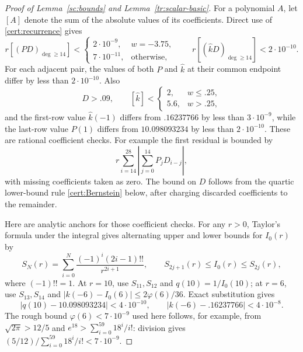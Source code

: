\begin{proof}[Proof of Lemma~\ref{sc:bounds} and Lemma~\ref{tr:scalar-basic}]
For a polynomial $A$, let $[A]$ denote the sum of the absolute values of
its coefficients. Direct use of \eqref{cert:recurrence} gives
\begin{equation}\label{cert:residuals}
 r[(PD)_{\deg\ge14}]<
 \begin{cases}2\cdot10^{-9},&w=-3.75,\\7\cdot10^{-11},&\text{otherwise},\end{cases}
 \qquad r[(\widehat k D)_{\deg\ge14}]<2\cdot10^{-10}.
\end{equation}
For each adjacent pair, the values of both $P$ and $\widehat k$ at their common
endpoint differ by less than $2\cdot10^{-10}$. Also
\begin{equation}\label{cert:additional-poly}
 D>.09,\qquad [\widehat k]<\begin{cases}2,&w\le.25,\\5.6,&w>.25,
 \end{cases}
\end{equation}
and the first-row value $\widehat k(-1)$ differs from $.16237766$ by less than
$3\cdot10^{-9}$, while the last-row value $P(1)$ differs from
$10.098093234$ by less than $2\cdot10^{-10}$.
These are rational coefficient checks. For example the first residual is
bounded by
\[
 r\sum_{i=14}^{28}\left|\sum_{j=0}^{14}P_jD_{i-j}\right|,
\]
with missing coefficients taken as zero. The bound on $D$ follows from
the quartic lower-bound rule \eqref{cert:Bernstein} below, after charging
discarded coefficients to the remainder.

Here are analytic anchors for those coefficient checks. For any $r>0$,
Taylor's formula under the integral gives alternating upper and lower
bounds for $I_0(r)$ by
\begin{equation}\label{cert:Mills}
 S_N(r)=\sum_{i=0}^{N}\frac{(-1)^i(2i-1)!!}{r^{2i+1}},
 \qquad S_{2j+1}(r)\le I_0(r)\le S_{2j}(r),
\end{equation}
where $(-1)!!=1$. At $r=10$, use $S_{11},S_{12}$ and $q(10)=1/I_0(10)$;
at $r=6$, use $S_{13},S_{14}$ and
$|k(-6)-I_0(6)|\le2\varphi(6)/36$. Exact substitution gives
\[
 |q(10)-10.098093234|<4\cdot10^{-10},\qquad
 |k(-6)-.16237766|<4\cdot10^{-8}.
\]
The rough bound $\varphi(6)<7\cdot10^{-9}$ used here follows, for example,
from $\sqrt{2\pi}>12/5$ and
$e^{18}>\sum_{i=0}^{59}18^i/i!$: division gives
$(5/12)/\sum_{i=0}^{59}18^i/i!<7\cdot10^{-9}$.


\end{proof}
